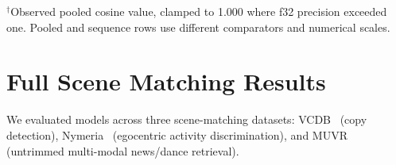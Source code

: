 \documentclass{article}
\theoremstyle{remark}
\begin{document}
\begin{table}[h]
\centering
\caption{VLM embedding probes across all tasks, grouped by pipeline stage. We report generative forward/reverse classification separately in Section~\ref{sec:vlm_generative} (Table~\ref{tab:vlm_generative}).}
\label{tab:summary_vlm}
\begin{flushleft}
\small $^\dagger$Observed pooled cosine value, clamped to 1.000 where f32 precision exceeded one. Pooled and sequence rows use different comparators and numerical scales.
\end{flushleft}
\end{table}

\section{Full Scene Matching Results}
\label{sec:scene_matching}

We evaluated models across three scene-matching datasets: VCDB~\cite{vcdb} (copy detection), Nymeria~\cite{nymeria} (egocentric activity discrimination), and MUVR~\cite{muvr} (untrimmed multi-modal news/dance retrieval).
\end{document}

